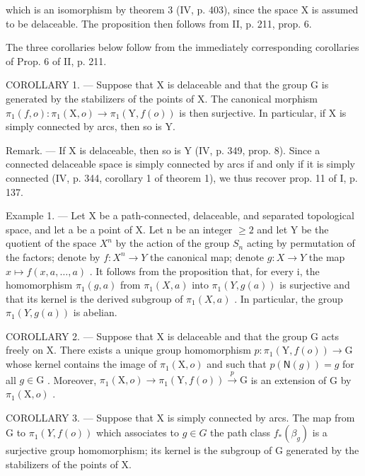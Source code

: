 which is an isomorphism by theorem 3 (IV, p. 403), since the space X is assumed to be delaceable. The proposition then follows from II, p. 211, prop. 6.

The three corollaries below follow from the immediately corresponding corollaries of Prop. 6 of II, p. 211.

COROLLARY 1. --- Suppose that X is delaceable and that the group G is generated by the stabilizers of the points of X. The canonical morphism \(\pi_{1}(f,o)\colon\pi_{1}(\mathrm{X},o)\to\pi_{1}(\mathrm{Y},f(o))\) is then surjective. In particular, if X is simply connected by arcs, then so is Y.

Remark. --- If X is delaceable, then so is Y (IV, p. 349, prop. 8). Since a connected delaceable space is simply connected by arcs if and only if it is simply connected (IV, p. 344, corollary 1 of theorem 1), we thus recover prop. 11 of I, p. 137.

Example 1. --- Let X be a path-connected, delaceable, and separated topological space, and let a be a point of X. Let n be an integer \(\geqslant 2\) and let Y be the quotient of the space \(X^{n}\) by the action of the group \(S_{n}\) acting by permutation of the factors; denote by \(f: X^{n} \to Y\) the canonical map; denote \(g: X \to Y\) the map \(x \mapsto f(x, a, \ldots, a)\) . It follows from the proposition that, for every i, the homomorphism \(\pi_{1}(g, a)\) from \(\pi_{1}(X, a)\) into \(\pi_{1}(Y, g(a))\) is surjective and that its kernel is the derived subgroup of \(\pi_{1}(X, a)\) . In particular, the group \(\pi_{1}(Y, g(a))\) is abelian.

COROLLARY 2. --- Suppose that X is delaceable and that the group G acts freely on X. There exists a unique group homomorphism \(p \colon \pi_1(\mathrm{Y}, f(o)) \to \mathrm{G}\) whose kernel contains the image of \(\pi_1(\mathrm{X}, o)\) and such that \(p(\mathsf{N}(g)) = g\) for all \(g \in \mathrm{G}\) . Moreover, \(\pi_1(\mathrm{X}, o) \to \pi_1(\mathrm{Y}, f(o)) \xrightarrow{p} \mathrm{G}\) is an extension of G by \(\pi_1(\mathrm{X}, o)\) .

COROLLARY 3. --- Suppose that X is simply connected by arcs. The map from G to \(\pi_1(Y, f(o))\) which associates to \(g \in G\) the path class \(f_*(\beta_g)\) is a surjective group homomorphism; its kernel is the subgroup of G generated by the stabilizers of the points of X.

